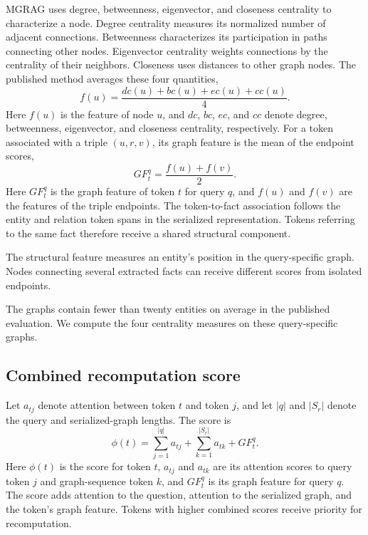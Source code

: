 MGRAG uses degree, betweenness, eigenvector, and closeness centrality to characterize a node. Degree centrality measures its normalized number of adjacent connections. Betweenness characterizes its participation in paths connecting other nodes. Eigenvector centrality weights connections by the centrality of their neighbors. Closeness uses distances to other graph nodes. The published method averages these four quantities,
\begin{equation}
 f(u)=\frac{dc(u)+bc(u)+ec(u)+cc(u)}{4}.
\label{eq:mgrag:node-feature}
\end{equation}
Here $f(u)$ is the feature of node $u$, and $dc$, $bc$, $ec$, and $cc$ denote degree, betweenness, eigenvector, and closeness centrality, respectively. For a token associated with a triple $(u,r,v)$, its graph feature is the mean of the endpoint scores,
\begin{equation}
 GF_t^q=\frac{f(u)+f(v)}{2}.
\label{eq:mgrag:token-feature}
\end{equation}
Here $GF_t^q$ is the graph feature of token $t$ for query $q$, and $f(u)$ and $f(v)$ are the features of the triple endpoints. The token-to-fact association follows the entity and relation token spans in the serialized representation. Tokens referring to the same fact therefore receive a shared structural component.

The structural feature measures an entity's position in the query-specific graph. Nodes connecting several extracted facts can receive different scores from isolated endpoints.

The graphs contain fewer than twenty entities on average in the published evaluation. We compute the four centrality measures on these query-specific graphs.

\subsection{Combined recomputation score}

Let $a_{tj}$ denote attention between token $t$ and token $j$, and let $|q|$ and $|S_r|$ denote the query and serialized-graph lengths. The score is
\begin{equation}
 \phi(t)=\sum_{j=1}^{|q|}a_{tj}
       +\sum_{k=1}^{|S_r|}a_{tk}+GF_t^q.
\label{eq:mgrag:cache-score}
\end{equation}
Here $\phi(t)$ is the score for token $t$, $a_{tj}$ and $a_{tk}$ are its attention scores to query token $j$ and graph-sequence token $k$, and $GF_t^q$ is its graph feature for query $q$. The score adds attention to the question, attention to the serialized graph, and the token's graph feature. Tokens with higher combined scores receive priority for recomputation.

